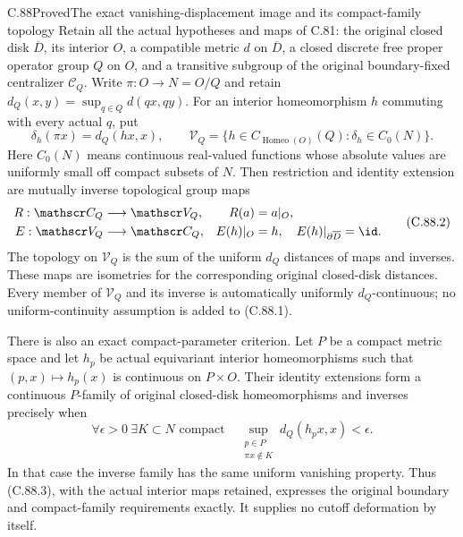\begin{claim}{C.88}{Proved}{The exact vanishing-displacement image and its compact-family topology}
Retain all the actual hypotheses and maps of
C.81: the original closed disk $\overline D$,
its interior $O$, a compatible metric $d$
on $\overline D$, a closed discrete free
proper operator group $Q$ on $O$, and a
transitive subgroup of the original
boundary-fixed centralizer $\mathscr C_Q$.
Write $\pi:O\to N=O/Q$ and retain
$d_Q(x,y)=\sup_{q\in Q}d(qx,qy)$.
For an interior homeomorphism $h$ commuting
with every actual $q$, put
\[
 \delta_h(\pi x)=d_Q(hx,x),\qquad
 \mathscr V_Q=
 \{h\in C_{\operatorname{Homeo}(O)}(Q):
                         \delta_h\in C_0(N)\}.                 \tag{C.88.1}
\]
Here $C_0(N)$ means continuous real-valued
functions whose absolute values are uniformly
small off compact subsets of $N$.
Then restriction and identity extension are
mutually inverse topological group maps
\[
 \begin{aligned}
 R:\mathscr C_Q&\longrightarrow\mathscr V_Q,
                       &R(a)&=a|_O,\\
 E:\mathscr V_Q&\longrightarrow\mathscr C_Q,
                       &E(h)|_O&=h,\quad
                         E(h)|_{\partial\overline D}=\id .
 \end{aligned}                                                   \tag{C.88.2}
\]
The topology on $\mathscr V_Q$ is the sum
of the uniform $d_Q$ distances of maps and
inverses. These maps are isometries for the
corresponding original closed-disk distances.
Every member of $\mathscr V_Q$ and its inverse
is automatically uniformly $d_Q$-continuous;
no uniform-continuity assumption is added
to (C.88.1).

There is also an exact compact-parameter
criterion. Let $P$ be a compact metric space
and let $h_p$ be actual equivariant interior
homeomorphisms such that $(p,x)\mapsto h_p(x)$
is continuous on $P\times O$. Their identity
extensions form a continuous $P$-family of
original closed-disk homeomorphisms and
inverses precisely when
\[
 \forall\epsilon>0\ \exists K\subset N
 \text{ compact}\quad
 \sup_{\substack{p\in P\\ \pi x\notin K}}
                    d_Q(h_p x,x)<\epsilon.                    \tag{C.88.3}
\]
In that case the inverse family has the
same uniform vanishing property. Thus
(C.88.3), with the actual interior maps
retained, expresses the original boundary
and compact-family requirements exactly.
It supplies no cutoff deformation by itself.
\end{claim}

